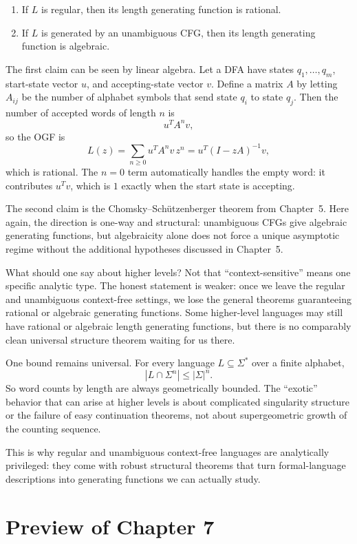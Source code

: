 \begin{enumerate}
  \item If $L$ is regular, then its length generating function is rational.
  \item If $L$ is generated by an unambiguous CFG, then its length generating function is algebraic.
\end{enumerate}

The first claim can be seen by linear algebra. Let a DFA have states $q_1,\dots,q_m$, start-state vector $u$, and accepting-state vector $v$. Define a matrix $A$ by letting $A_{ij}$ be the number of alphabet symbols that send state $q_i$ to state $q_j$. Then the number of accepted words of length $n$ is
\[
  u^T A^n v,
\]
so the OGF is
\[
  L(z) = \sum_{n \ge 0} u^T A^n v\, z^n = u^T (I-zA)^{-1} v,
\]
which is rational. The $n=0$ term automatically handles the empty word: it contributes $u^T v$, which is $1$ exactly when the start state is accepting.

The second claim is the Chomsky--Sch\"utzenberger theorem from Chapter~5. Here again, the direction is one-way and structural: unambiguous CFGs give algebraic generating functions, but algebraicity alone does not force a unique asymptotic regime without the additional hypotheses discussed in Chapter~5.

What should one say about higher levels? Not that ``context-sensitive'' means one specific analytic type. The honest statement is weaker: once we leave the regular and unambiguous context-free settings, we lose the general theorems guaranteeing rational or algebraic generating functions. Some higher-level languages may still have rational or algebraic length generating functions, but there is no comparably clean universal structure theorem waiting for us there.

One bound remains universal. For every language $L \subseteq \Sigma^*$ over a finite alphabet,
\[
  |L \cap \Sigma^n| \le |\Sigma|^n.
\]
So word counts by length are always geometrically bounded. The ``exotic'' behavior that can arise at higher levels is about complicated singularity structure or the failure of easy continuation theorems, not about supergeometric growth of the counting sequence.

This is why regular and unambiguous context-free languages are analytically privileged: they come with robust structural theorems that turn formal-language descriptions into generating functions we can actually study.

\section*{Preview of Chapter 7}

